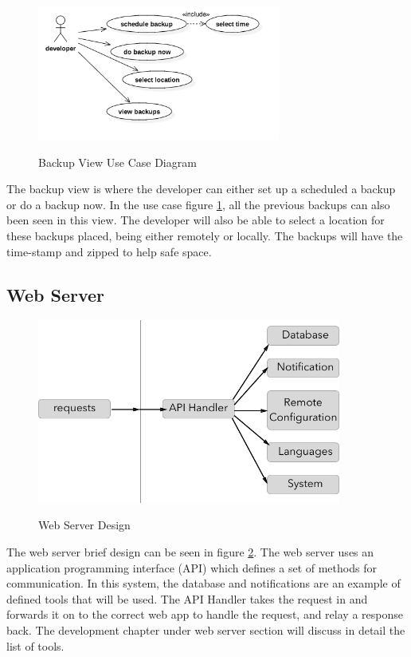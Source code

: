 \begin{figure}[!h]
    \caption{Backup View Use Case Diagram}
    \centering
    \includegraphics[width=80mm]{images/use_cases/backup_uc}
    \label{fig:backup_uc}
\end{figure}

The backup view is where the developer can either set up a scheduled a backup or do a backup now. In the use case figure \ref{fig:backup_uc}, all the previous backups can also been seen in this view. The developer will also be able to select a location for these backups placed, being either remotely or locally. The backups will have the time-stamp and zipped to help safe space.

\subsection{Web Server}

\begin{figure}[!h]
    \caption{Web Server Design}
    \centering
    \includegraphics[width=100mm]{images/design/api_handler}
    \label{fig:api_handler}
\end{figure}

The web server brief design can be seen in figure \ref{fig:api_handler}. The web server uses an application programming interface (API) which defines a set of methods for communication. In this system, the database and notifications are an example of defined tools that will be used. The API Handler takes the request in and forwards it on to the correct web app to handle the request, and relay a response back. The development chapter under web server section will discuss in detail the list of tools.


